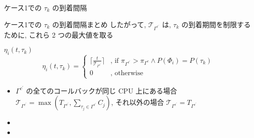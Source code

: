 \begin{frame}{ケース1での $\tau_k$ の到着間隔}
\end{frame}

\begin{frame}{ケース1での $\tau_k$ の到着間隔まとめ}
    したがって,  $\mathcal{T}_{\Gamma^{c^{\prime}}}$ は,  $\tau_{k}$ の到着期間を制限するために, これら 2 つの最大値を取る
    \begin{block}{$\eta_{i}\left(t, \tau_{k}\right)$}
        \vspace{-2mm}
        \begin{equation*}
            \eta_{i}\left(t, \tau_{k}\right)= \begin{cases}{\lceil\frac{t}{\mathcal{T}_{\Gamma^{c^{\prime}}}}\rceil} & \text {, if } \pi_{\Gamma^{c^{\prime}}}>\pi_{\Gamma^{c}} \wedge P\left(\Phi_{i}\right)=P\left(\tau_{k}\right) \\ 0 &, \text { otherwise }\end{cases}
        \end{equation*}
        \vspace{-2mm}
        \setlength{\linewidth}{0.98\columnwidth}
        \begin{itemize}
            \item $\Gamma^{c^{\prime}}$ の全てのコールバックが同じ CPU 上にある場合 $\mathcal{T}_{\Gamma^{c^{\prime}}}=\max \left(T_{\Gamma^{c^{\prime}}}, \sum_{\tau_{j} \in \Gamma^{c^{\prime}}} C_{j}\right)$, それ以外の場合 $\mathcal{T}_{\Gamma^{c^{\prime}}}=T_{\Gamma^{c^{\prime}}}$
            \item {}
            \item {}
        \end{itemize}
    \end{block}
\end{frame}

